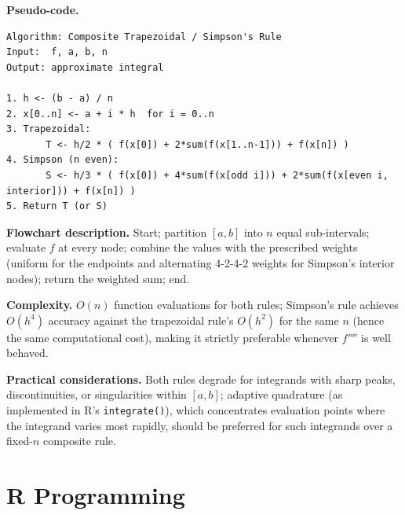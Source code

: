 \documentclass[
]{article}
\begin{document}
\textbf{Pseudo-code.}

\begin{verbatim}
Algorithm: Composite Trapezoidal / Simpson's Rule
Input:  f, a, b, n
Output: approximate integral

1. h <- (b - a) / n
2. x[0..n] <- a + i * h  for i = 0..n
3. Trapezoidal:
       T <- h/2 * ( f(x[0]) + 2*sum(f(x[1..n-1])) + f(x[n]) )
4. Simpson (n even):
       S <- h/3 * ( f(x[0]) + 4*sum(f(x[odd i])) + 2*sum(f(x[even i, interior])) + f(x[n]) )
5. Return T (or S)
\end{verbatim}

\textbf{Flowchart description.} Start; partition \([a,b]\) into \(n\)
equal sub-intervals; evaluate \(f\) at every node; combine the values
with the prescribed weights (uniform for the endpoints and alternating
4-2-4-2 weights for Simpson's interior nodes); return the weighted sum;
end.

\textbf{Complexity.} \(O(n)\) function evaluations for both rules;
Simpson's rule achieves \(O(h^4)\) accuracy against the trapezoidal
rule's \(O(h^2)\) for the same \(n\) (hence the same computational
cost), making it strictly preferable whenever \(f''''\) is well behaved.

\textbf{Practical considerations.} Both rules degrade for integrands
with sharp peaks, discontinuities, or singularities within \([a,b]\);
adaptive quadrature (as implemented in R's \texttt{integrate()}), which
concentrates evaluation points where the integrand varies most rapidly,
should be preferred for such integrands over a fixed-\(n\) composite
rule.

\section{R Programming}\label{r-programming}
\end{document}
